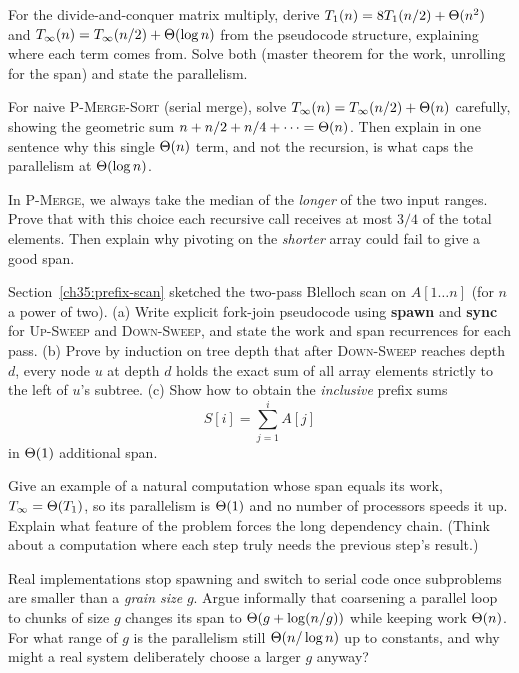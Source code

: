 \begin{exercise}
For the divide-and-conquer matrix multiply, derive $T_1(n) = 8T_1(n/2)+\Theta(n^2)$
and $T_\infty(n) = T_\infty(n/2) + \Theta(\log n)$ from the pseudocode structure,
explaining where each term comes from. Solve both (master theorem for the work,
unrolling for the span) and state the parallelism.
\end{exercise}

\begin{exercise}
For naive \textsc{P-Merge-Sort} (serial merge), solve $T_\infty(n) =
T_\infty(n/2) + \Theta(n)$ carefully, showing the geometric sum
$n + n/2 + n/4 + \cdots = \Theta(n)$. Then explain in one sentence why this single
$\Theta(n)$ term, and not the recursion, is what caps the parallelism at $\Theta(\log
n)$.
\end{exercise}

\begin{exercise}
In \textsc{P-Merge}, we always take the median of the \emph{longer} of the two
input ranges. Prove that with this choice each recursive call receives at most
$3/4$ of the total elements. Then explain why pivoting on the \emph{shorter}
array could fail to give a good span.
\end{exercise}

\begin{exercise}
Section~\ref{ch35:prefix-scan} sketched the two-pass Blelloch scan on $A[1\ldots n]$
(for $n$ a power of two). (a) Write explicit fork-join pseudocode using
\textbf{spawn} and \textbf{sync} for \textsc{Up-Sweep} and \textsc{Down-Sweep},
and state the work and span recurrences for each pass. (b) Prove by induction on
tree depth that after \textsc{Down-Sweep} reaches depth $d$, every node $u$ at
depth $d$ holds the exact sum of all array elements strictly to the left of $u$'s
subtree. (c) Show how to obtain the \emph{inclusive} prefix sums
\[
S[i] = \sum_{j=1}^i A[j]
\]
in $\Theta(1)$ additional span.
\end{exercise}

\begin{exercise}
Give an example of a natural computation whose span equals its work, $T_\infty =
\Theta(T_1)$, so its parallelism is $\Theta(1)$ and no number of processors speeds it up.
Explain what feature of the problem forces the long dependency chain. (Think about
a computation where each step truly needs the previous step's result.)
\end{exercise}

\begin{exercise}
Real implementations stop spawning and switch to serial code once subproblems are
smaller than a \emph{grain size} $g$. Argue informally that coarsening a parallel
loop to chunks of size $g$ changes its span to $\Theta(g + \log(n/g))$ while keeping
work $\Theta(n)$. For what range of $g$ is the parallelism still $\Theta(n/\log n)$ up to
constants, and why might a real system deliberately choose a larger $g$ anyway?
\end{exercise}
